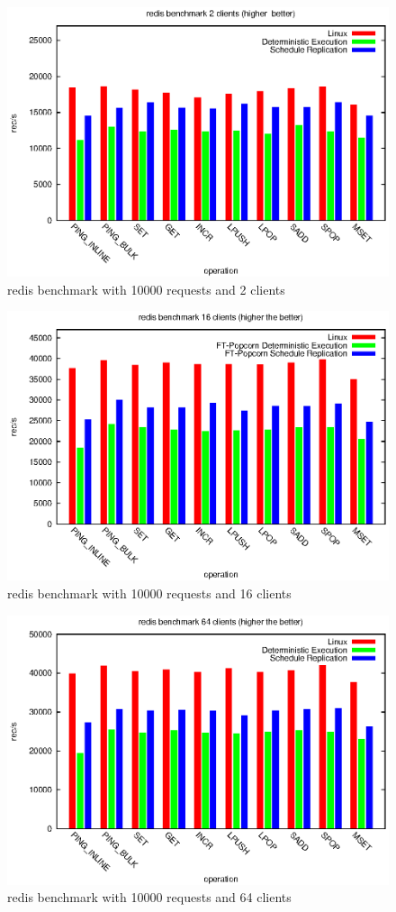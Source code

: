 \begin{figure}
\centering
\includegraphics[width=0.8\columnwidth]{figures/redis_2}
\caption{redis benchmark with 10000 requests and 2 clients}
\label{f:redis_2}
\end{figure}

\begin{figure}
\centering
\includegraphics[width=0.8\columnwidth]{figures/redis_16}
\caption{redis benchmark with 10000 requests and 16 clients}
\label{f:redis_16}
\end{figure}

\begin{figure}
\centering
\includegraphics[width=0.8\columnwidth]{figures/redis_64}
\caption{redis benchmark with 10000 requests and 64 clients}
\label{f:redis_64}
\end{figure}

